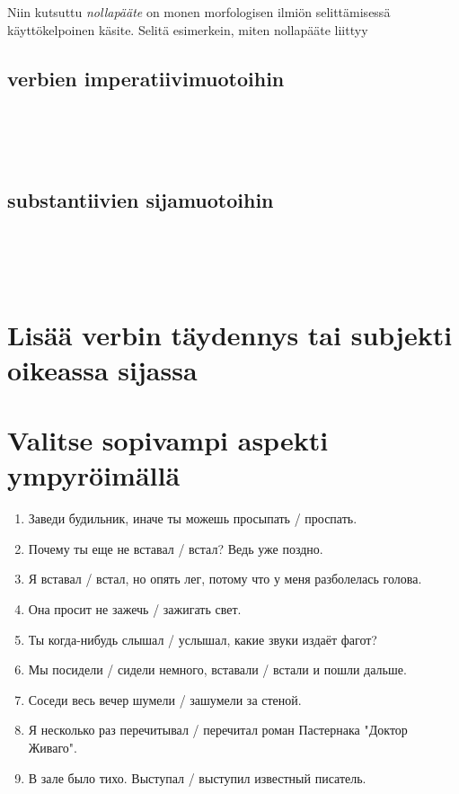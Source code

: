 \documentclass[paper=a4, fontsize=11pt]{scrartcl}
\begin{document}
\section{}

Niin kutsuttu \emph{nollapääte} on monen morfologisen ilmiön selittämisessä käyttökelpoinen käsite. Selitä esimerkein, miten nollapääte liittyy

\subsection{verbien imperatiivimuotoihin}
    \underline{\hspace{\textwidth}}\\[.3cm] 
    \underline{\hspace{\textwidth}}\\[.3cm] 
    \underline{\hspace{\textwidth}}\\[.3cm] 


\subsection{substantiivien sijamuotoihin}
    \underline{\hspace{\textwidth}}\\[.3cm] 
    \underline{\hspace{\textwidth}}\\[.3cm] 
    \underline{\hspace{\textwidth}}\\[.3cm] 


\section{Lisää verbin täydennys tai subjekti oikeassa sijassa}


\section{Valitse sopivampi aspekti ympyröimällä}
\begin{enumerate}
    \item Заведи будильник, иначе ты можешь просыпать  / проспать.
    \item Почему ты еще не вставал / встал? Ведь уже поздно.
    \item Я вставал / встал, но опять лег, потому что у меня разболелась голова.
    \item Она просит не зажечь / зажигать свет.
    \item Ты когда-нибудь слышал / услышал, какие звуки издаёт фагот? 
    \item Мы посидели / сидели немного, вставали / встали и пошли дальше.
    \item Соседи весь вечер шумели / зашумели за стеной.
    \item Я несколько раз перечитывал / перечитал роман Пастернака "Доктор Живаго".
    \item В зале было тихо. Выступал  / выступил известный писатель.
\end{enumerate}
\end{document}
